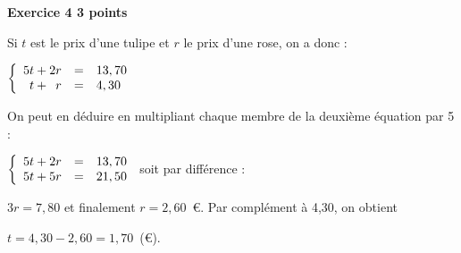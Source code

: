\textbf{Exercice 4 \hfill 3 points}

\medskip
 
% 
% 
%
% 
%
%

%
%
Si $t$ est le prix d’une tulipe et $r$ le prix d’une rose, on a donc :

$\left\{\begin{array}{l c l}
5t + 2r&=&13,70\\
\phantom{5}t + \phantom{5}r&=&4,30
\end{array}\right.$

On peut en déduire en multipliant chaque membre de la deuxième équation par 5 :

$\left\{\begin{array}{l c l}
5t + 2r&=&13,70\\
5t + 5r&=&21,50
\end{array}\right.$ soit par différence :

$3r = 7,80$ et finalement $r = 2,60$~\euro. Par complément à 4,30, on obtient 

$t = 4,30 - 2,60 = 1,70$~(\euro).
\vspace{0,5cm}

